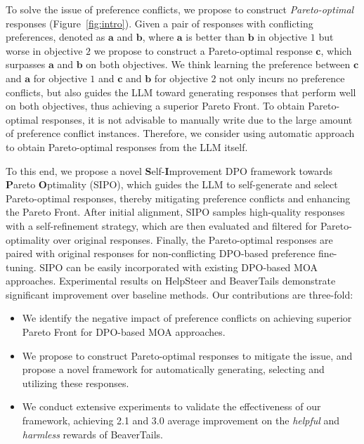 To solve the issue of preference conflicts, we propose to construct \emph{Pareto-optimal} responses (\cf Figure~\ref{fig:intro}). 
Given a pair of responses with conflicting preferences, denoted as $\textbf{a}$ and $\textbf{b}$, where $\textbf{a}$ is better than $\textbf{b}$ in objective $1$ but worse in objective $2$ we propose to construct a Pareto-optimal response $\textbf{c}$, which surpasses $\textbf{a}$ and $\textbf{b}$ on both objectives. 
We think learning the preference between $\textbf{c}$ and $\textbf{a}$ for objective $1$ and $\textbf{c} $ and $\textbf{b}$ for objective $2$ not only incurs no preference conflicts, but also guides the LLM toward generating responses that perform well on both objectives, thus achieving a superior Pareto Front. 
To obtain Pareto-optimal responses, it is not advisable to manually write due to the large amount of preference conflict instances. 
Therefore, we consider using automatic approach to obtain Pareto-optimal responses from the LLM itself. 


To this end, we propose a novel \textbf{S}elf-\textbf{I}mprovement DPO framework towards \textbf{P}areto \textbf{O}ptimality (SIPO), which guides the LLM to self-generate and select Pareto-optimal responses, thereby mitigating preference conflicts and enhancing the Pareto Front. 
After initial alignment, SIPO samples high-quality responses with a self-refinement strategy, which are then evaluated and filtered for Pareto-optimality over original responses. 
Finally, the Pareto-optimal responses are paired with original responses for non-conflicting DPO-based preference fine-tuning. 
SIPO can be easily incorporated with existing DPO-based MOA approaches. 
Experimental results on HelpSteer \cite{DBLP:conf/acl/WangLXYDQZZ24} and BeaverTails \cite{DBLP:conf/nips/JiLDPZB0SW023} demonstrate significant improvement over baseline methods. Our contributions are three-fold:
\begin{itemize}
    \item We identify the negative impact of preference conflicts on achieving superior Pareto Front for DPO-based MOA approaches. 
    \item We propose to construct Pareto-optimal responses to mitigate the issue, and propose a novel framework for automatically generating, selecting and utilizing these responses. 
    \item We conduct extensive experiments to validate the effectiveness of our framework, achieving 2.1 and 3.0 average improvement on the \emph{helpful} and \emph{harmless} rewards of BeaverTails. 
\end{itemize}



 

